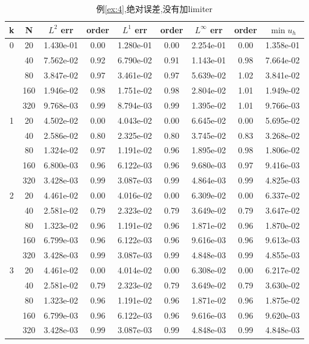 \documentclass[a4paper, 11pt]{ctexart}
\numberwithin{equation}{section}
\numberwithin{figure}{section}
\begin{document}
\begin{table}[H]
  \centering
  \begin{tabular}{c|c|c|c|c|c|c|c|c} \toprule
 k  &  N &  $L^2$ err& order&$L^1$ err  &order & $L^\infty$ err&order& $\min u_h$ \\ \midrule
 \multirow{5}{*}{0}  &  20 & 1.430e-01 & 0.00 & 1.280e-01 & 0.00 & 2.254e-01 & 0.00 & 1.358e-01 \\
                     &  40 & 7.562e-02 & 0.92 & 6.790e-02 & 0.91 & 1.143e-01 & 0.98 & 7.664e-02 \\
                     &  80 & 3.847e-02 & 0.97 & 3.461e-02 & 0.97 & 5.639e-02 & 1.02 & 3.841e-02 \\
                     & 160 & 1.946e-02 & 0.98 & 1.751e-02 & 0.98 & 2.804e-02 & 1.01 & 1.949e-02 \\
                     & 320 & 9.768e-03 & 0.99 & 8.794e-03 & 0.99 & 1.395e-02 & 1.01 & 9.766e-03 \\ \midrule
 \multirow{5}{*}{1}  &  20 & 4.502e-02 & 0.00 & 4.043e-02 & 0.00 & 6.645e-02 & 0.00 & 5.695e-02 \\
                     &  40 & 2.586e-02 & 0.80 & 2.325e-02 & 0.80 & 3.745e-02 & 0.83 & 3.268e-02 \\
                     &  80 & 1.324e-02 & 0.97 & 1.191e-02 & 0.96 & 1.895e-02 & 0.98 & 1.806e-02 \\
                     & 160 & 6.800e-03 & 0.96 & 6.122e-03 & 0.96 & 9.680e-03 & 0.97 & 9.416e-03 \\
                     & 320 & 3.428e-03 & 0.99 & 3.087e-03 & 0.99 & 4.864e-03 & 0.99 & 4.825e-03 \\ \midrule
 \multirow{5}{*}{2}  &  20 & 4.461e-02 & 0.00 & 4.016e-02 & 0.00 & 6.309e-02 & 0.00 & 6.337e-02 \\
                     &  40 & 2.581e-02 & 0.79 & 2.323e-02 & 0.79 & 3.649e-02 & 0.79 & 3.647e-02 \\
                     &  80 & 1.323e-02 & 0.96 & 1.191e-02 & 0.96 & 1.871e-02 & 0.96 & 1.870e-02 \\
                     & 160 & 6.799e-03 & 0.96 & 6.122e-03 & 0.96 & 9.616e-03 & 0.96 & 9.613e-03 \\
                     & 320 & 3.428e-03 & 0.99 & 3.087e-03 & 0.99 & 4.848e-03 & 0.99 & 4.855e-03 \\ \midrule
 \multirow{5}{*}{3}  &  20 & 4.461e-02 & 0.00 & 4.014e-02 & 0.00 & 6.308e-02 & 0.00 & 6.217e-02 \\
                     &  40 & 2.581e-02 & 0.79 & 2.323e-02 & 0.79 & 3.649e-02 & 0.79 & 3.630e-02 \\
                     &  80 & 1.323e-02 & 0.96 & 1.191e-02 & 0.96 & 1.871e-02 & 0.96 & 1.875e-02 \\
                     & 160 & 6.799e-03 & 0.96 & 6.122e-03 & 0.96 & 9.616e-03 & 0.96 & 9.620e-03 \\
                     & 320 & 3.428e-03 & 0.99 & 3.087e-03 & 0.99 & 4.848e-03 & 0.99 & 4.848e-03 \\ \bottomrule
  \end{tabular}
  \caption{例\ref{ex:4},绝对误差,没有加limiter}
\end{table}
\end{document}
